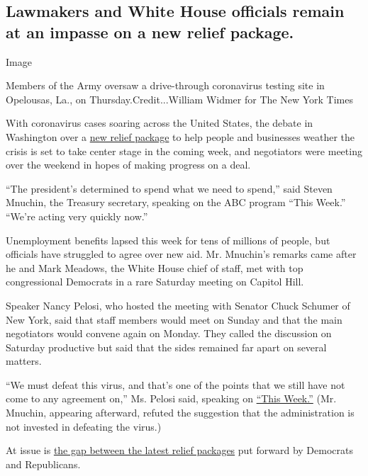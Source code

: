 \hypertarget{lawmakers-and-white-house-officials-remain-at-an-impasse-on-a-new-relief-package}{%
\subsection{Lawmakers and White House officials remain at an impasse on
a new relief
package.}\label{lawmakers-and-white-house-officials-remain-at-an-impasse-on-a-new-relief-package}}

Image

Members of the Army oversaw a drive-through coronavirus testing site in
Opelousas, La., on Thursday.Credit...William Widmer for The New York
Times

With coronavirus cases soaring across the United States, the debate in
Washington over a
\href{https://www.nytimes3xbfgragh.onion/2020/07/28/us/politics/coronavirus-relief-bills-house-senate.html}{new
relief package} to help people and businesses weather the crisis is set
to take center stage in the coming week, and negotiators were meeting
over the weekend in hopes of making progress on a deal.

``The president's determined to spend what we need to spend,'' said
Steven Mnuchin, the Treasury secretary, speaking on the ABC program
``This Week.'' ``We're acting very quickly now.''

Unemployment benefits lapsed this week for tens of millions of people,
but officials have struggled to agree over new aid. Mr. Mnuchin's
remarks came after he and Mark Meadows, the White House chief of staff,
met with top congressional Democrats in a rare Saturday meeting on
Capitol Hill.

Speaker Nancy Pelosi, who hosted the meeting with Senator Chuck Schumer
of New York, said that staff members would meet on Sunday and that the
main negotiators would convene again on Monday. They called the
discussion on Saturday productive but said that the sides remained far
apart on several matters.

``We must defeat this virus, and that's one of the points that we still
have not come to any agreement on,'' Ms. Pelosi said, speaking on
\href{https://abcnews.go.com/ThisWeek/video/speaker-house-nancy-pelosi-72130729}{``This
Week.''} (Mr. Mnuchin, appearing afterward, refuted the suggestion that
the administration is not invested in defeating the virus.)

At issue is
\href{https://www.nytimes3xbfgragh.onion/2020/07/28/us/politics/coronavirus-relief-bills-house-senate.html}{the
gap between the latest relief packages} put forward by Democrats and
Republicans.


